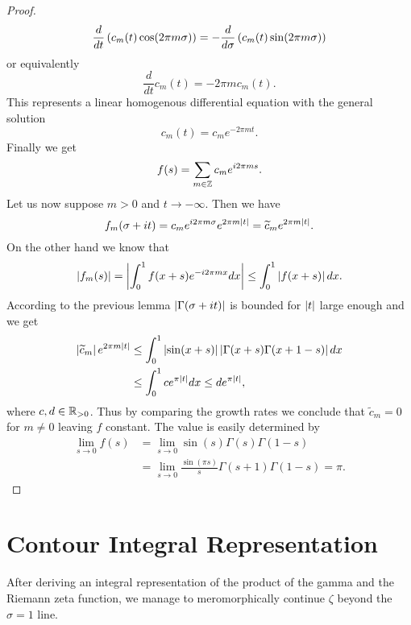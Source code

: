 \begin{proof}
\begin{equation*}
	\frac{d}{dt}\left(c_m(t) \cos(2 \pi m \sigma)\right) = - \frac{d}{d\sigma}\left(c_m(t) \sin(2 \pi m \sigma)\right)
\end{equation*}
	or equivalently
\begin{equation*}
	\frac{d}{dt} c_m(t) = -2 \pi m c_m(t).
\end{equation*}
	This represents a linear homogenous differential equation with the general solution
\begin{equation*}
	c_m(t) = c_m e^{-2 \pi m t}.
\end{equation*}
	Finally we get
\begin{equation*}
	f(s) = \sum _{m \in \mathbb{Z}} c_m e^{i 2 \pi m s}.
\end{equation*}
	Let us now suppose $m > 0$ and $t \to -\infty$. Then we have
\begin{equation*}
	f_m(\sigma + i t) = c_m e^{i 2 \pi m \sigma} e^{2 \pi m \left|t\right|} = \widetilde{c}_m e^{2 \pi m \left|t\right|}.
\end{equation*}
	On the other hand we know that
\begin{equation*}
	\left|f_m(s)\right| = \left|\int _0 ^1 f(x + s) e^{- i 2 \pi m x} dx\right| \leq \int _0 ^1 \left|f(x + s)\right| dx.
\end{equation*}
	According to the previous lemma  $\left|\Gamma(\sigma + i t)\right|$ is bounded for $\left|t\right|$ large enough and we get
\begin{equation*}
\begin{aligned}
	\left|\widetilde{c}_m\right| e^{2 \pi m \left|t\right|}
	&\leq \int_0^1 \left|\sin(x + s)\right| \left|\Gamma(x + s) \Gamma(x + 1 - s)\right| dx \\
	&\leq \int_0^1 c e^{\pi \left|t\right|} dx
	\leq d e^{\pi \left|t\right|},
\end{aligned}
\end{equation*}
	where $c,d \in \mathbb{R}_{> 0}$. Thus by comparing the growth rates we conclude that $\widetilde{c}_m = 0$ for $m \neq 0$ leaving $f$ constant. The value is easily determined by
\begin{equation*}
\begin{aligned}
	\lim\limits_{s \to 0} f(s)
	&= \lim\limits_{s \to 0} \sin(s) \Gamma(s) \Gamma(1 - s) \\
	&= \lim\limits_{s \to 0} \frac{\sin(\pi s)}{s} \Gamma(s + 1) \Gamma(1 - s)
	= \pi.
\end{aligned}	
\end{equation*}
\end{proof}


\section{Contour Integral Representation}
After deriving an integral representation of the product of the gamma and the Riemann zeta function, we manage to meromorphically continue $\zeta$ beyond the $\sigma = 1$ line.


